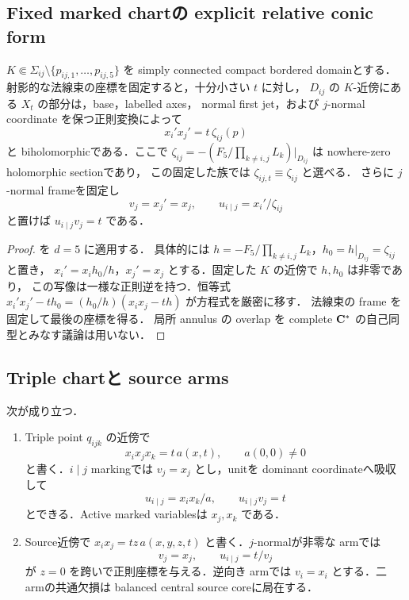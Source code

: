\documentclass[a4paper,11pt]{ltjsarticle}
\numberwithin{equation}{section}
\theoremstyle{plain}
\theoremstyle{definition}
\theoremstyle{remark}
\begin{document}
\subsection{Fixed marked chartの explicit relative conic form}

\begin{proposition}\label{sharp:prop:conic-normal-form}
$K\Subset\Sigma_{ij}\setminus\{p_{ij,1},\dots,p_{ij,5}\}$ を simply connected compact bordered domainとする．
射影的な法線束の座標を固定すると，十分小さい $t$ に対し，
$D_{ij}$ の $K$-近傍にある $X_t$ の部分は，base，labelled axes，
normal first jet，および $j$-normal coordinate を保つ正則変換によって
\begin{equation}\label{sharp:eq:conic-normal-form}
 x_i' x_j'=t\,\zeta_{ij}(p)
\end{equation}
と biholomorphicである．ここで
$\zeta_{ij}=-(F_5/\prod_{k\ne i,j}L_k)|_{D_{ij}}$ は nowhere-zero holomorphic sectionであり，
この固定した族では $\zeta_{ij,t}\equiv\zeta_{ij}$ と選べる．
さらに $j$-normal frameを固定し
\begin{equation}\label{sharp:eq:oriented-coordinates}
 v_j=x_j'=x_j,\qquad u_{i\mid j}=x_i'/\zeta_{ij}
\end{equation}
と置けば $u_{i\mid j}v_j=t$ である．
\end{proposition}

\begin{proof}
 を $d=5$ に適用する．
具体的には $h=-F_5/\prod_{k\ne i,j}L_k$，$h_0=h|_{D_{ij}}=\zeta_{ij}$ と置き，
$x_i'=x_i h_0/h$，$x_j'=x_j$ とする．固定した $K$ の近傍で $h,h_0$ は非零であり，
この写像は一様な正則逆を持つ．恒等式
$x_i'x_j'-t h_0=(h_0/h)(x_ix_j-th)$ が方程式を厳密に移す．
法線束の frame を固定して最後の座標を得る．
局所 annulus の overlap を complete $\mathbf C^*$ の自己同型とみなす議論は用いない．
\end{proof}

\subsection{Triple chartと source arms}

\begin{lemma}\label{sharp:lem:local-oriented-forms}
次が成り立つ．
\begin{enumerate}[label=\textup{(\roman*)}]
\item Triple point $q_{ijk}$ の近傍で
      \[
       x_ix_jx_k=t\,a(x,t),\qquad a(0,0)\ne0
      \]
      と書く．$i\mid j$ markingでは $v_j=x_j$ とし，unitを dominant coordinateへ吸収して
      \[
       u_{i\mid j}=x_ix_k/a,\qquad u_{i\mid j}v_j=t
      \]
      とできる．Active marked variablesは $x_j,x_k$ である．
\item Source近傍で $x_ix_j=tz\,a(x,y,z,t)$ と書く．$j$-normalが非零な armでは
      \[
       v_j=x_j,\qquad u_{i\mid j}=t/v_j
      \]
      が $z=0$ を跨いで正則座標を与える．逆向き armでは $v_i=x_i$ とする．二 armの共通欠損は balanced central source coreに局在する．
\end{enumerate}
\end{lemma}
\end{document}
